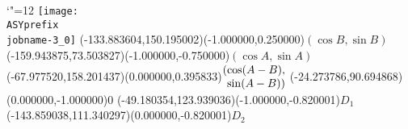 \setlength{\unitlength}{1pt}%
\makeatletter%
\let\ASYencoding\f@encoding%
\let\ASYfamily\f@family%
\let\ASYseries\f@series%
\let\ASYshape\f@shape%
\makeatother%
{\catcode`"=12%
\texttt{[image: \\ASYprefix\\jobname-3\_0]}%
}%
\color{ASYcolor}%
\fontsize{12.000000}{14.400000}\selectfont%
\usefont{\ASYencoding}{\ASYfamily}{\ASYseries}{\ASYshape}%
\ASYalign(-133.883604,150.195002)(-1.000000,0.250000){$(\cos B, \sin B)$}%
\color{ASYcolor}%
\fontsize{12.000000}{14.400000}\selectfont%
\ASYalign(-159.943875,73.503827)(-1.000000,-0.750000){$(\cos A, \sin A)$}%
\color{ASYcolor}%
\fontsize{12.000000}{14.400000}\selectfont%
\ASYalign(-67.977520,158.201437)(0.000000,0.395833){$\arraycolsep=0pt \begin{array}{rl} (& \cos (A-B), \\ & \sin (A-B)) \end{array}$}%
\color{ASYcolor}%
\fontsize{12.000000}{14.400000}\selectfont%
\ASYalign(-24.273786,90.694868)(0.000000,-1.000000){$0$}%
\color{ASYcolor}%
\fontsize{12.000000}{14.400000}\selectfont%
\ASYalign(-49.180354,123.939036)(-1.000000,-0.820001){$D_1$}%
\color{ASYcolor}%
\fontsize{12.000000}{14.400000}\selectfont%
\ASYalign(-143.859038,111.340297)(0.000000,-0.820001){$D_2$}%

